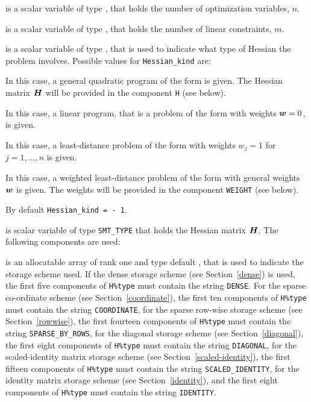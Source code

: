 \documentclass{galahad}
\begin{document}
\begin{description}

 is a scalar variable of type \integer, 
 that holds the number of optimization variables, $n$.  
              
 is a scalar variable of type \integer, 
 that holds the number of linear constraints, $m$.
              
 is a scalar variable of type \integer, 
that is used to indicate what type of Hessian the problem involves.
Possible values for {\tt Hessian\_kind} are:

\begin{description}
  In this case, a general quadratic program of the form
 is given. The Hessian matrix ${\bm{H}}$ will be provided in the 
component {\tt H} (see below).

  In this case, a linear program, that is a problem of the form 
 with weights ${\bm{w}} = 0$, is given.

 In this case, a least-distance problem of the form 
with weights $w_{j} = 1$ for $j = 1, \ldots , n$ is given.

 In this case, a weighted least-distance problem of the form 
with general weights ${\bm{w}}$ is given. The weights will be
provided in the component {\tt WEIGHT} (see below).
\end{description}
By default {\tt Hessian\_kind = - 1}.

 is scalar variable of type {\tt SMT\_TYPE} 
that holds the Hessian matrix ${\bm{H}}$. The following components
are used:

\begin{description}

 is an allocatable array of rank one and type default \character, 
that is used to indicate the storage scheme used. If the dense storage scheme 
(see Section~\ref{dense}) is used, 
the first five components of {\tt H\%type} must contain the
string {\tt DENSE}.
For the sparse co-ordinate scheme (see Section~\ref{coordinate}), 
the first ten components of {\tt H\%type} must contain the
string {\tt COORDINATE},  
for the sparse row-wise storage scheme (see Section~\ref{rowwise}),
the first fourteen components of {\tt H\%type} must contain the
string {\tt SPARSE\_BY\_ROWS},
for the diagonal storage scheme (see Section~\ref{diagonal}),
the first eight components of {\tt H\%type} must contain the
string {\tt DIAGONAL},
for the scaled-identity matrix storage scheme
(see Section~\ref{scaled-identity}),
the first fifteen components of {\tt H\%type} must contain the
string {\tt SCALED\_IDENTITY},
for the identity matrix storage scheme
(see Section~\ref{identity}), and
the first eight components of {\tt H\%type} must contain the
string {\tt IDENTITY}.


\end{description}
\end{description}
\end{document}

